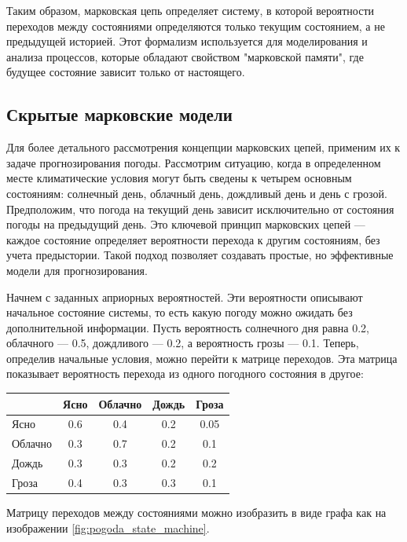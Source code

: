 Таким образом, марковская цепь определяет систему, в которой вероятности переходов между состояниями определяются только текущим состоянием, а не предыдущей историей. Этот формализм используется для моделирования и анализа процессов, которые обладают свойством "марковской памяти", где будущее состояние зависит только от настоящего.

\subsection{Скрытые марковские модели}

Для более детального рассмотрения концепции марковских цепей, применим их к задаче прогнозирования погоды. Рассмотрим ситуацию, когда в определенном месте климатические условия могут быть сведены к четырем основным состояниям: солнечный день, облачный день, дождливый день и день с грозой. Предположим, что погода на текущий день зависит исключительно от состояния погоды на предыдущий день. Это ключевой принцип марковских цепей — каждое состояние определяет вероятности перехода к другим состояниям, без учета предыстории. Такой подход позволяет создавать простые, но эффективные модели для прогнозирования.

Начнем с заданных априорных вероятностей. Эти вероятности описывают начальное состояние системы, то есть какую погоду можно ожидать без дополнительной информации. Пусть вероятность солнечного дня равна 0.2, облачного — 0.5, дождливого — 0.2, а вероятность грозы — 0.1. Теперь, определив начальные условия, можно перейти к матрице переходов. Эта матрица показывает вероятность перехода из одного погодного состояния в другое:

\begin{center}
		\label{tab:pogoda_prob}
		\begin{tabular}{|l|c|c|c|c|}
			\hline
			\textbf{} & Ясно & Облачно & Дождь & Гроза \\ \hline
			Ясно      & 0.6  & 0.4     & 0.2   & 0.05  \\ \hline
			Облачно   & 0.3  & 0.7     & 0.2   & 0.1   \\ \hline
			Дождь     & 0.3  & 0.3     & 0.2   & 0.2   \\ \hline
			Гроза     & 0.4  & 0.3     & 0.3   & 0.1   \\ \hline
		\end{tabular}
\end{center}

Матрицу переходов между состояниями можно изобразить в виде графа как на изображении \ref{fig:pogoda_state_machine}.


